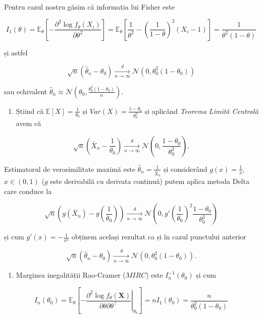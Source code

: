 \documentclass[]{article}
\providecommand{\tightlist}{%
  \setlength{\itemsep}{0pt}\setlength{\parskip}{0pt}}
\begin{document}
Pentru cazul nostru găsim că informația lui Fisher este

\[
  I_1(\theta) = \mathbb{E}_{\theta}\left[-\frac{\partial^2 \log f_{\theta}(X_i)}{\partial \theta^2}\right] = \mathbb{E}_{\theta}\left[\frac{1}{\theta^2} - \left(\frac{1}{1-\theta}\right)^2 (X_i-1)\right] = \frac{1}{\theta^2(1-\theta)}
\]

și astfel

\[
  \sqrt{n}\left(\hat{\theta}_n - \theta_0\right) \underset{n\to\infty}{\overset{d}{\longrightarrow}} \mathcal{N}(0, \theta_0^2(1-\theta_0))
\]

sau echivalent
\(\hat{\theta}_n \approx \mathcal{N}\left(\theta_0, \frac{\theta_0^2(1-\theta_0)}{n}\right)\).

\begin{enumerate}
\def\labelenumi{\alph{enumi})}
\setcounter{enumi}{4}
\tightlist
\item
  Știind că \(\mathbb{E}[X] = \frac{1}{\theta_0}\) și
  \(Var(X) = \frac{1-\theta_0}{\theta_0^2}\) și aplicând \emph{Teorema
  Limită Centrală} avem că
\end{enumerate}

\[
  \sqrt{n}\left(\bar{X}_n - \frac{1}{\theta_0}\right) \underset{n\to\infty}{\overset{d}{\longrightarrow}} \mathcal{N}\left(0, \frac{1-\theta_0}{\theta_0^2}\right).
\]

Estimatorul de verosimilitate maximă este
\(\hat{\theta}_n = \frac{1}{\bar{X}_n}\) și considerând
\(g(x) = \frac{1}{x}\), \(x\in(0,1)\) (\(g\) este derivabilă cu derivata
continuă) putem aplica metoda Delta care conduce la

\[
  \sqrt{n}\left(g(\bar{X}_n) - g\left(\frac{1}{\theta_0}\right)\right) \underset{n\to\infty}{\overset{d}{\longrightarrow}} \mathcal{N}\left(0, g'\left(\frac{1}{\theta_0}\right)^2\frac{1-\theta_0}{\theta_0^2}\right)
\]

și cum \(g'(x) = -\frac{1}{x^2}\) obținem același rezultat ca și în
cazul punctului anterior

\[
  \sqrt{n}\left(\hat{\theta}_n - \theta_0\right) \underset{n\to\infty}{\overset{d}{\longrightarrow}} \mathcal{N}(0, \theta_0^2(1-\theta_0)).
\]

\begin{enumerate}
\def\labelenumi{\alph{enumi})}
\setcounter{enumi}{5}
\tightlist
\item
  Marginea inegalității Rao-Cramer (\(MIRC\)) este
  \(I_n^{-1}(\theta_0)\) și cum
\end{enumerate}

\[
  I_n(\theta_0) = \mathbb{E}_{\theta}\left[-\left.\frac{\partial^2 \log f_{\theta}(\mathbf{X})}{\partial\theta\partial\theta^\intercal}\right\rvert_{\theta_0}\right] = nI_1(\theta_0) = \frac{n}{\theta_0^2(1-\theta_0)}
\]
\end{document}
